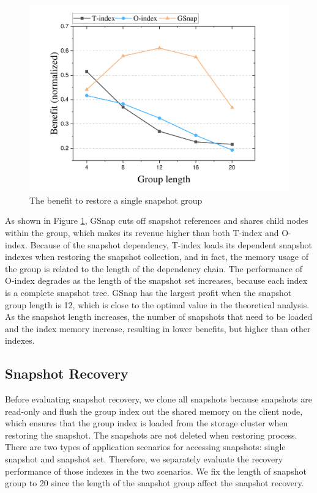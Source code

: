 \documentclass[sigconf, nonacm]{acmart}
\begin{document}
\begin{figure}[htbp]
	\centering
	\includegraphics[width=0.8\columnwidth]{figures/ceph_pic/eval_grouplength.pdf}
	\caption{The benefit to restore a single snapshot group}
	\label{fig:grouplength}
\end{figure}
\vspace{-0.3cm}

As shown in Figure \ref{fig:grouplength}, GSnap cuts off snapshot references and shares child nodes within the group, which makes its revenue higher than both T-index and O-index. Because of the snapshot dependency, T-index loads its dependent snapshot indexes when restoring the snapshot collection, and in fact, the memory usage of the group is related to the length of the dependency chain. The performance of O-index degrades as the length of the snapshot set increases, because each index is a complete snapshot tree. GSnap has the largest profit when the snapshot group length is 12, which is close to the optimal value in the theoretical analysis. As the snapshot length increases, the number of snapshots that need to be loaded and the index memory increase, resulting in lower benefits, but higher than other indexes.

\subsection{Snapshot Recovery}
Before evaluating snapshot recovery, we clone all snapshots because snapshots are read-only and flush the group index out the shared memory on the client node, which ensures that the group index is loaded from the storage cluster when restoring the snapshot. The snapshots are not deleted when restoring process. There are two types of application scenarios for accessing snapshots: single snapshot and snapshot set.
Therefore, we separately evaluate the recovery performance of those indexes in the two scenarios.
We fix the length of snapshot group to 20 since the length of the snapshot group affect the snapshot recovery.
\end{document}
